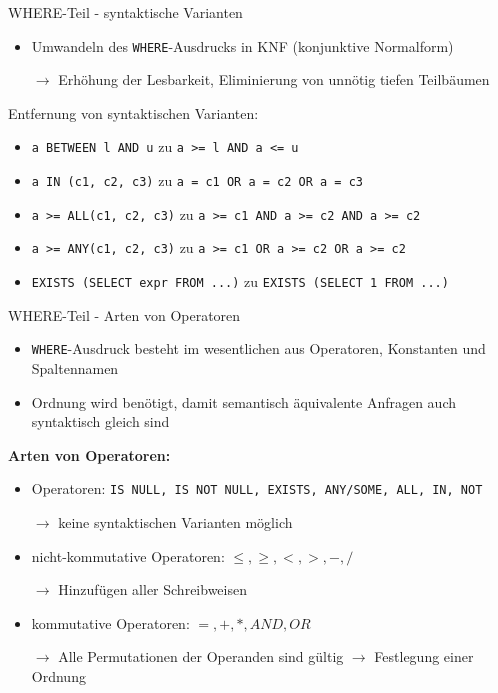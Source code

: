 \documentclass{beamer}
\begin{document}
\begin{frame}[fragile]{WHERE-Teil - syntaktische Varianten}
\begin{itemize}
\item Umwandeln des \verb|WHERE|-Ausdrucks in KNF (konjunktive Normalform) 
\item[$\to$] Erhöhung der Lesbarkeit, Eliminierung von unnötig tiefen Teilbäumen
\end{itemize}
Entfernung von syntaktischen Varianten:
\begin{itemize}
\item \verb|a BETWEEN l AND u| zu \verb|a >= l AND a <= u|
\item \verb|a IN (c1, c2, c3)| zu \verb|a = c1 OR a = c2 OR a = c3|
\item \verb|a >= ALL(c1, c2, c3)| zu \verb|a >= c1 AND a >= c2 AND a >= c2|
\item \verb|a >= ANY(c1, c2, c3)| zu \verb|a >= c1 OR a >= c2 OR a >= c2|
\item \verb|EXISTS (SELECT expr FROM ...)| zu \verb|EXISTS (SELECT 1 FROM ...)|
\end{itemize}
\end{frame}

\begin{frame}[fragile]{WHERE-Teil - Arten von Operatoren}
\begin{itemize}
\item \verb|WHERE|-Ausdruck besteht im wesentlichen aus Operatoren, Konstanten und Spaltennamen
\item Ordnung wird benötigt, damit semantisch äquivalente Anfragen auch syntaktisch gleich sind
\end{itemize}
\textbf{Arten von Operatoren:}
\begin{itemize}
\item Operatoren: \verb|IS NULL, IS NOT NULL, EXISTS, ANY/SOME, ALL, IN, NOT|
\item[$\to$] keine syntaktischen Varianten möglich
\item nicht-kommutative Operatoren: $\leq,\geq,<,>,-,/$
\item[$\to$] Hinzufügen aller Schreibweisen
\item kommutative Operatoren: $=,+,*,AND,OR$
\item[$\to$] Alle Permutationen der Operanden sind gültig $\to$ Festlegung einer Ordnung
\end{itemize}

\end{frame}
\end{document}
